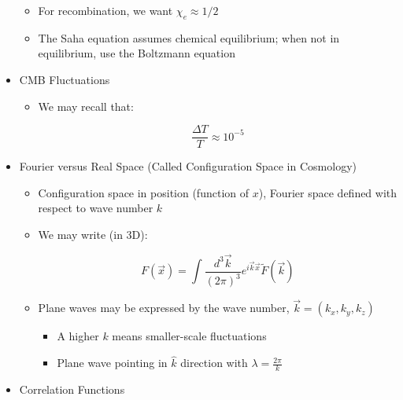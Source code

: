 \begin{itemize}
\begin{itemize}
      \item For recombination, we want $\chi_e\approx 1/2$

      \item The Saha equation assumes chemical equilibrium; when not in equilibrium, use the Boltzmann equation

    \end{itemize}

  \item CMB Fluctuations

    \begin{itemize}

      \item We may recall that:

        $$\frac{\Delta T}{T}\approx 10^{-5}$$

    \end{itemize}

  \item Fourier versus Real Space (Called Configuration Space in Cosmology)

    \begin{itemize}

      \item Configuration space in position (function of $x$), Fourier space defined with respect to wave number $k$

      \item We may write (in 3D):

        $$F(\vec{x})=\int\frac{d^3\vec{k}}{(2\pi)^{3}}e^{i\vec{k}\vec{x}}\tilde{F}(\vec{k})$$

      \item Plane waves may be expressed by the wave number, $\vec{k}=(k_x,k_y,k_z)$

        \begin{itemize}

          \item A higher $k$ means smaller-scale fluctuations

          \item Plane wave pointing in $\hat{k}$ direction with $\lambda=\frac{2\pi}{k}$

        \end{itemize}

    \end{itemize}

  \item Correlation Functions

    \begin{itemize}


\end{itemize}
\end{itemize}
